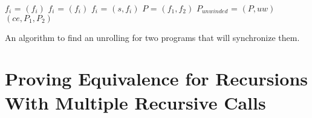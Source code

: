 \noindent
\begin{algorithm}
\begin{minipage}{\linewidth}
\begin{algorithmic}[1]
    \label{step:foreach_p}
    \State $f_i$ = $(f_i)$\label{step:block_bc}
    \State $f_i$ = $(f_i)$\label{step:depth_tracking}
        \label{step:undeterministic_branching}
            \State $f_i$ = $(s,f_i)$
        \EndIf
        \EndFor
    \EndFor
    \State $P$ = $(f_1,f_2)$
        \State $P_{unwinded}$ = $(P,uw)$
        \State \Return {}$(ce,P_1,P_2)$
        \EndIf
    \EndFor
\EndFunction
\end{algorithmic}
\end{minipage}
\caption{An algorithm to find an unrolling for two programs that will synchronize them.}
\label{alg:Findunrolling}
\end{algorithm}
\section{Proving Equivalence for Recursions With Multiple Recursive Calls}
\label{sec:newproof}
